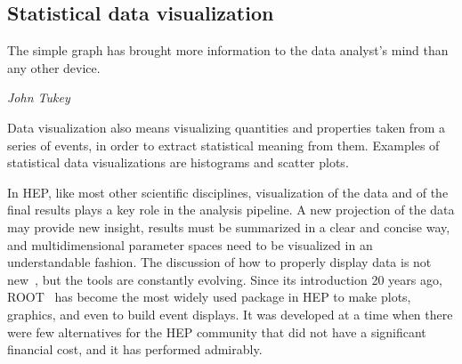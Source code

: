 \documentclass[12pt,a4paper]{article}
\begin{document}


\hypertarget{statistical-data-visualization}{%
\subsection{Statistical data visualization}\label{statistical-data-visualization}}


\epigraph{The simple graph has brought more information to the data analyst's mind than any other device.}{\textit{John Tukey \cite{Tukey1962}}}

Data visualization also means visualizing quantities and properties taken from a series of events, in order to extract statistical
meaning from them. Examples of statistical data visualizations are histograms and scatter plots.

In HEP, like most other scientific disciplines, visualization of the data and of the final results plays a key role in the
analysis pipeline. A new projection of the data may provide new insight, results must be summarized in a
clear and concise way, and multidimensional parameter spaces need to be visualized in an understandable fashion. The discussion
of how to properly display data is not new~\cite{Tufte1986}, but the tools are constantly evolving. Since its introduction 20 years ago,
ROOT~\cite{Root1997} has become the most widely used package in HEP to make plots, graphics, and even to build event displays.
It was developed at a time when there were few alternatives for the HEP community that did not have a significant
financial cost, and it has performed admirably.
\end{document}
